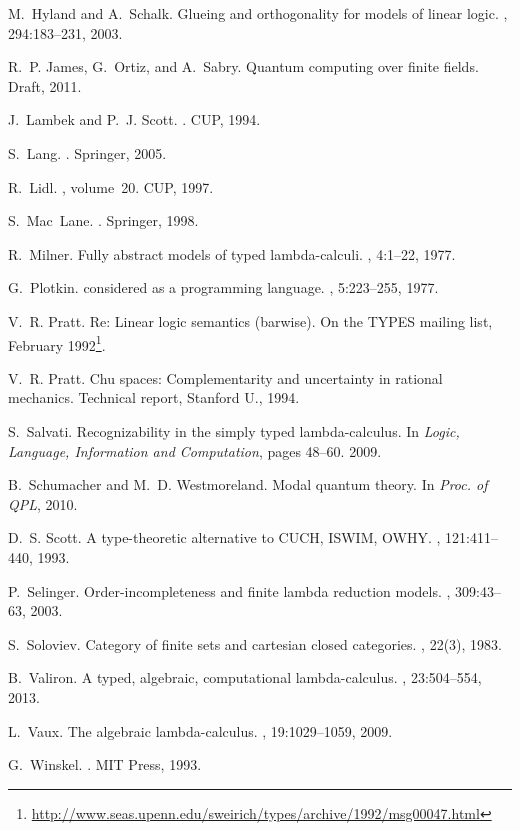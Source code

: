 \documentclass[10pt]{article}
\theoremstyle{plain}
\theoremstyle{definition}
\begin{document}
\begin{thebibliography}{10}
M.~Hyland and A.~Schalk.
\newblock Glueing and orthogonality for models of linear logic.
, 294:183--231, 2003.

R.~P. James, G.~Ortiz, and A.~Sabry.
\newblock Quantum computing over finite fields.
\newblock Draft, 2011.

J.~Lambek and P.~J. Scott.
.
\newblock CUP, 1994.

S.~Lang.
.
\newblock Springer, 2005.

R.~Lidl.
, volume~20.
\newblock CUP, 1997.

S.~Mac~Lane.
.
\newblock Springer, 1998.

R.~Milner.
\newblock Fully abstract models of typed lambda-calculi.
, 4:1--22, 1977.

G.~Plotkin.
 considered as a programming language.
, 5:223--255, 1977.

V.~R. Pratt.
\newblock Re: Linear logic semantics (barwise).
\newblock On the {TYPES} mailing list, February 1992\footnote{\scriptsize \url{http://www.seas.upenn.edu/sweirich/types/archive/1992/msg00047.html}}.

V.~R. Pratt.
\newblock Chu spaces: Complementarity and uncertainty in rational mechanics.
\newblock Technical report, Stanford U., 1994.

S.~Salvati.
\newblock Recognizability in the simply typed lambda-calculus.
\newblock In {\em Logic, Language, Information and Computation}, pages 48--60.
  2009.

B.~Schumacher and M.~D. Westmoreland.
\newblock Modal quantum theory.
\newblock In {\em Proc. of QPL}, 2010.

D.~S. Scott.
\newblock A type-theoretic alternative to {CUCH}, {ISWIM}, {OWHY}.
, 121:411--440, 1993.

P.~Selinger.
\newblock Order-incompleteness and finite lambda reduction models.
, 309:43--63, 2003.

S.~Soloviev.
\newblock Category of finite sets and cartesian closed categories.
, 22(3), 1983.

B.~Valiron.
\newblock A typed, algebraic, computational lambda-calculus.
, 23:504--554, 2013.

L.~Vaux.
\newblock The algebraic lambda-calculus.
, 19:1029--1059, 2009.

G.~Winskel.
.
\newblock MIT Press, 1993.

\end{thebibliography}
\end{document}
